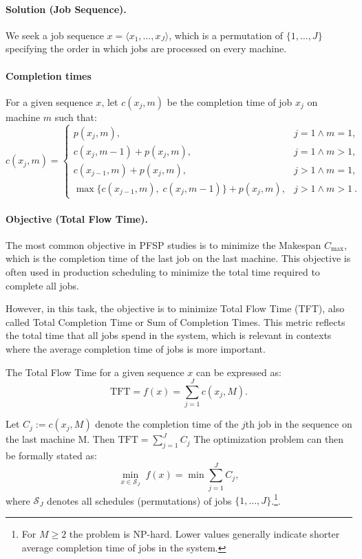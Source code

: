 \documentclass[12pt,a4paper]{report}
\begin{document}
\paragraph{Solution (Job Sequence).}
We seek a job sequence $x = \langle x_1,\ldots,x_J\rangle$, which is a permutation of $\{1,\ldots,J\}$ specifying the order in which jobs are processed on every machine.

\paragraph{Completion times}
For a given sequence $x$, let $c(x_j,m)$ be the completion time of job $x_j$ on machine $m$ such that:
\begin{equation}
\label{eq:c-recurrence}
 c(x_j,m) =
 \begin{cases}
  p(x_j,m), & j=1 \land m=1,\\
  c(x_j,m-1) + p(x_j,m), & j=1 \land m>1,\\
  c(x_{j-1},m) + p(x_j,m), & j>1 \land m=1,\\
  \max\{c(x_{j-1},m),\; c(x_j,m-1)\} + p(x_j,m), & j>1 \land m>1~. 
 \end{cases}
\end{equation}

\paragraph{Objective (Total Flow Time).}
The most common objective in PFSP studies is to minimize the Makespan \(C_{\max}\), which is the completion time of the last job on the last machine. This objective is often used in production scheduling to minimize the total time required to complete all jobs.

However, in this task, the objective is to minimize Total Flow Time (TFT), also called Total Completion Time or Sum of Completion Times. This metric reflects the total time that all jobs spend in the system, which is relevant in contexts where the average completion time of jobs is more important.

The Total Flow Time for a given sequence $x$ can be expressed as:
\[
\mathrm{TFT} = f(x) = \sum_{j=1}^{J} c(x_j, M).
\]

Let $C_j := c(x_j,M)$ denote the completion time of the $j$th job in the sequence on the last machine M. Then $\mathrm{TFT} = \sum_{j=1}^{J} C_j$ The optimization problem can then be formally stated as:
\begin{equation}
 \min_{x \in \mathcal{S}_J} \; f(x) = \min \sum_{j=1}^{J} C_j,
\end{equation}
where $\mathcal{S}_J$ denotes all schedules (permutations) of jobs $\{1,\ldots,J\}$.\footnote{For $M\ge 2$ the problem is NP-hard. Lower values generally indicate shorter average completion time of jobs in the system.}. 
\end{document}
